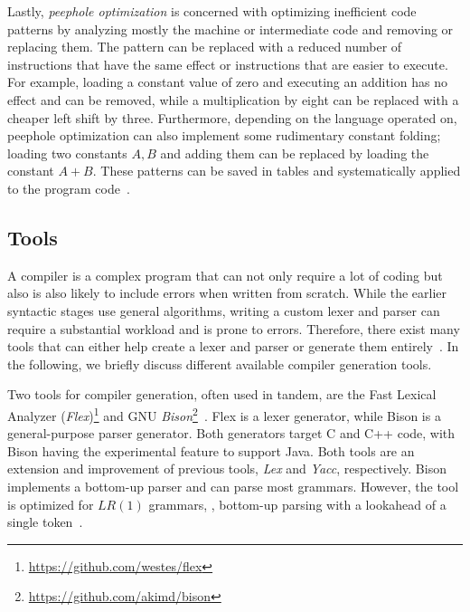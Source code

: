 Lastly, \emph{peephole optimization} is concerned with optimizing inefficient code patterns by analyzing mostly the machine or intermediate code and removing or replacing them. The pattern can be replaced with a reduced number of instructions that have the same effect or instructions that are easier to execute. For example, loading a constant value of zero and executing an addition has no effect and can be removed, while a multiplication by eight can be replaced with a cheaper left shift by three. Furthermore, depending on the language operated on, peephole optimization can also implement some rudimentary constant folding; loading two constants $A, B$ and adding them can be replaced by loading the constant $A + B$. These patterns can be saved in tables and systematically applied to the program code~\cite{McKe65,TvS82}.

\subsection{Tools}
\label{sec:background_compilerTools}
A compiler is a complex program that can not only require a lot of coding but also is also likely to include errors when written from scratch. While the earlier syntactic stages use general algorithms, writing a custom lexer and parser can require a substantial workload and is prone to errors. Therefore, there exist many tools that can either help create a lexer and parser or generate them entirely~\cite{PaFi11, ZLY17}. In the following, we briefly discuss different available compiler generation tools.

Two tools for compiler generation, often used in tandem, are the Fast Lexical Analyzer (\emph{Flex})\footnote{\url{https://github.com/westes/flex}} and GNU \emph{Bison}\footnote{\url{https://github.com/akimd/bison}}~\cite{DoSt99}.
Flex is a lexer generator, while Bison is a general-purpose parser generator. Both generators target C and C++ code, with Bison having the experimental feature to support Java.
Both tools are an extension and improvement of previous tools, \emph{Lex} and \emph{Yacc}, respectively.
Bison implements a bottom-up parser and can parse most grammars. However, the tool is optimized for $LR(1)$ grammars, \ie, bottom-up parsing with a lookahead of a single token~\cite{ZLY17,Aaby03,DoSt99}.

